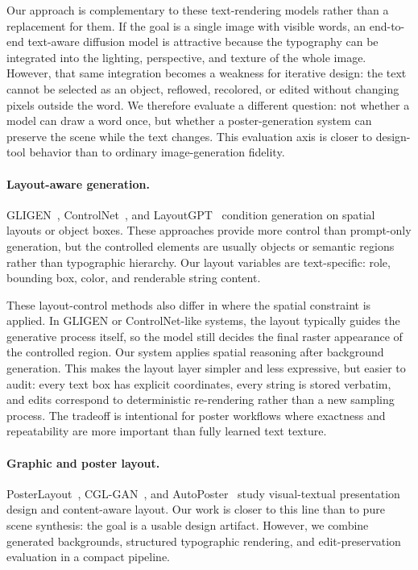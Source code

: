 \documentclass[10pt,twocolumn,letterpaper]{article}
\begin{document}
Our approach is complementary to these text-rendering models rather than a replacement for them. If the goal is a single image with visible words, an end-to-end text-aware diffusion model is attractive because the typography can be integrated into the lighting, perspective, and texture of the whole image. However, that same integration becomes a weakness for iterative design: the text cannot be selected as an object, reflowed, recolored, or edited without changing pixels outside the word. We therefore evaluate a different question: not whether a model can draw a word once, but whether a poster-generation system can preserve the scene while the text changes. This evaluation axis is closer to design-tool behavior than to ordinary image-generation fidelity.

\paragraph{Layout-aware generation.}
GLIGEN~\cite{li2023gligen}, ControlNet~\cite{zhang2023controlnet}, and LayoutGPT~\cite{feng2023layoutgpt} condition generation on spatial layouts or object boxes. These approaches provide more control than prompt-only generation, but the controlled elements are usually objects or semantic regions rather than typographic hierarchy. Our layout variables are text-specific: role, bounding box, color, and renderable string content.

These layout-control methods also differ in where the spatial constraint is applied. In GLIGEN or ControlNet-like systems, the layout typically guides the generative process itself, so the model still decides the final raster appearance of the controlled region. Our system applies spatial reasoning after background generation. This makes the layout layer simpler and less expressive, but easier to audit: every text box has explicit coordinates, every string is stored verbatim, and edits correspond to deterministic re-rendering rather than a new sampling process. The tradeoff is intentional for poster workflows where exactness and repeatability are more important than fully learned text texture.

\paragraph{Graphic and poster layout.}
PosterLayout~\cite{hsu2023posterlayout}, CGL-GAN~\cite{zhou2022cgl}, and AutoPoster~\cite{lin2023autoposter} study visual-textual presentation design and content-aware layout. Our work is closer to this line than to pure scene synthesis: the goal is a usable design artifact. However, we combine generated backgrounds, structured typographic rendering, and edit-preservation evaluation in a compact pipeline.
\end{document}

